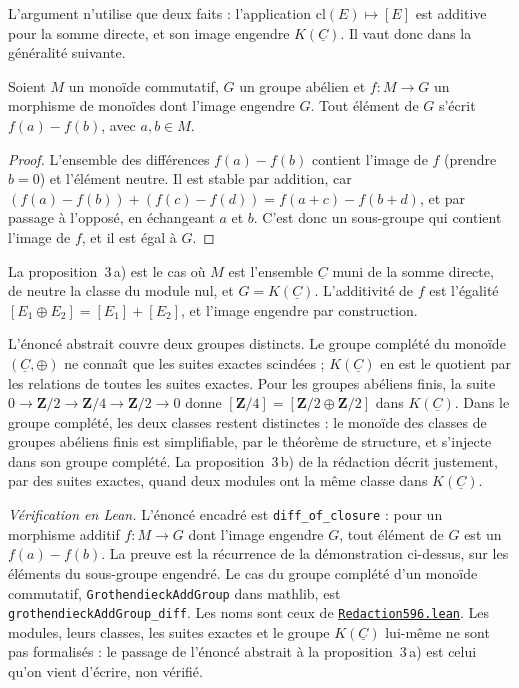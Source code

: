 L'argument n'utilise que deux faits : l'application $\mathrm{cl}(E) \mapsto [E]$ est additive pour la somme directe, et son image engendre $K(\underline C)$. Il vaut donc dans la généralité suivante.

\begin{encadre}
\begin{enonce}
Soient $M$ un monoïde commutatif, $G$ un groupe abélien et $f : M \to G$ un morphisme de monoïdes dont l'image engendre $G$. Tout élément de $G$ s'écrit $f(a) - f(b)$, avec $a, b \in M$.
\end{enonce}
\end{encadre}

\begin{proof}
L'ensemble des différences $f(a) - f(b)$ contient l'image de $f$ (prendre $b = 0$) et l'élément neutre. Il est stable par addition, car $(f(a) - f(b)) + (f(c) - f(d)) = f(a + c) - f(b + d)$, et par passage à l'opposé, en échangeant $a$ et $b$. C'est donc un sous-groupe qui contient l'image de $f$, et il est égal à $G$.
\end{proof}

\noindent La proposition~3\,a) est le cas où $M$ est l'ensemble $\underline C$ muni de la somme directe, de neutre la classe du module nul, et $G = K(\underline C)$. L'additivité de $f$ est l'égalité $[E_1 \oplus E_2] = [E_1] + [E_2]$, et l'image engendre par construction.

\begin{remarque}
L'énoncé abstrait couvre deux groupes distincts. Le groupe complété du monoïde $(\underline C, \oplus)$ ne connaît que les suites exactes scindées ; $K(\underline C)$ en est le quotient par les relations de toutes les suites exactes. Pour les groupes abéliens finis, la suite $0 \to \mathbf Z/2 \to \mathbf Z/4 \to \mathbf Z/2 \to 0$ donne $[\mathbf Z/4] = [\mathbf Z/2 \oplus \mathbf Z/2]$ dans $K(\underline C)$. Dans le groupe complété, les deux classes restent distinctes : le monoïde des classes de groupes abéliens finis est simplifiable, par le théorème de structure, et s'injecte dans son groupe complété. La proposition~3\,b) de la rédaction décrit justement, par des suites exactes, quand deux modules ont la même classe dans $K(\underline C)$.
\end{remarque}

\noindent\emph{Vérification en Lean.} L'énoncé encadré est \texttt{diff\_of\_closure} : pour un morphisme additif $f : M \to G$ dont l'image engendre $G$, tout élément de $G$ est un $f(a) - f(b)$. La preuve est la récurrence de la démonstration ci-dessus, sur les éléments du sous-groupe engendré. Le cas du groupe complété d'un monoïde commutatif, \texttt{GrothendieckAddGroup} dans mathlib, est \texttt{grothendieckAddGroup\_diff}. Les noms sont ceux de \href{\leanblobmain/Redaction596.lean}{\texttt{Redaction596.\allowbreak{}lean}}. Les modules, leurs classes, les suites exactes et le groupe $K(\underline C)$ lui-même ne sont pas formalisés : le passage de l'énoncé abstrait à la proposition~3\,a) est celui qu'on vient d'écrire, non vérifié.

